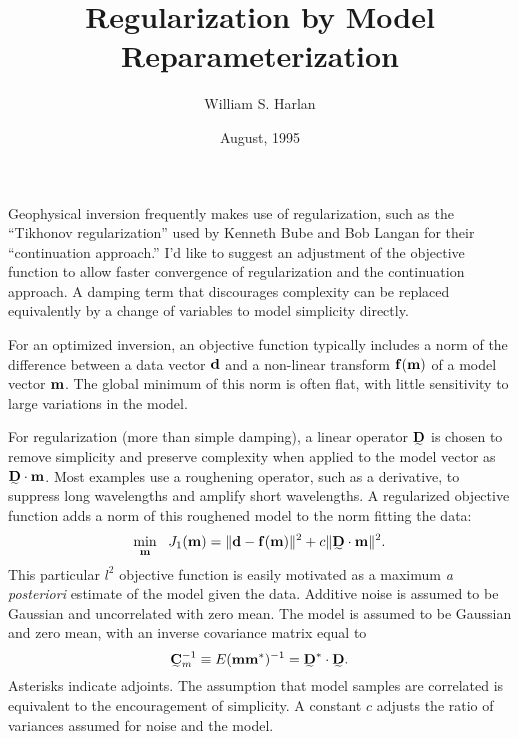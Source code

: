 \documentclass[12pt]{article}
\begin{document}
  


\title{Regularization by Model Reparameterization}

\author{William S. Harlan}

\date{August, 1995}

\maketitle

Geophysical inversion frequently makes use of regularization,
such as the ``Tikhonov regularization'' 
used by Kenneth Bube and Bob Langan \cite{SEG-1994-0980}
for their ``continuation approach.''
I'd like to suggest an adjustment of the objective
function to allow faster convergence of
regularization and the continuation approach.
A damping term that discourages complexity can be
replaced equivalently by a change of variables to 
model simplicity directly.

For an optimized inversion, an objective function typically
includes a norm of the difference
between a data vector ${\mbox{\boldmath $\bf d$}}$ and a non-linear transform
${\mbox{\boldmath $\bf f$}}( {\mbox{\boldmath $\bf m$}})$ of a model vector ${\mbox{\boldmath $\bf m$}}$.
The global minimum of this norm is often flat, with
little sensitivity to large variations in the model.

For regularization (more than simple damping), a 
linear operator $\stensor{D}$ is chosen
to remove simplicity and preserve complexity when applied
to the model vector as $\stensor{D} \cdot \svector{m}$.  
Most examples use a roughening operator, such as a derivative, to suppress
long wavelengths and amplify short wavelengths.
A regularized objective function adds a norm of
this roughened model to the norm fitting the data:
\begin{equation}
\label{eq:orig}
\min_{\svector{\scriptstyle m}} ~~
J_1 (\svector{m} )=
\| \svector{d} - \svector{f}(\svector{m}) \|^2 
+ c \| \stensor{D} \cdot \svector{m} \|^2 .
\end{equation}
This particular $l^2$ objective function is easily motivated
as a maximum {\sl a posteriori} estimate of the model given
the data.  Additive noise is assumed to be Gaussian
and uncorrelated with zero mean.  The model is assumed to be Gaussian
and zero mean, with an inverse covariance matrix equal to 
\begin{equation}
\label{eq:cova}
\stensor{C}_m^{-1} \equiv E(\svector{m} \svector{m}^* )^{-1} 
= \stensor{D}^* \cdot \stensor{D} .
\end{equation}
Asterisks indicate adjoints.
The assumption that model samples are correlated is equivalent
to the encouragement of simplicity.  A constant $c$
adjusts the ratio of variances assumed for noise and the model.
\end{document}
